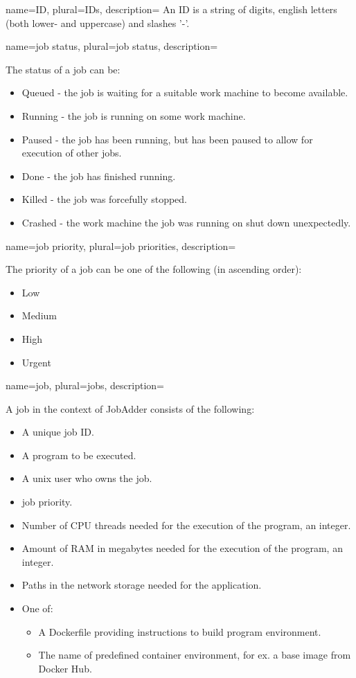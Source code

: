 {
  name=ID,
  plural=IDs,
  description={
    An ID is a string of digits, english letters (both lower- and uppercase) and slashes '-'.
  }
}
{
  name=job status,
  plural=job status,
  description={
    The status of a job can be:
    \begin{itemize}
      \item Queued - the job is waiting for a suitable work machine to become available.
      \item Running - the job is running on some work machine.
      \item Paused - the job has been running, but has been paused to allow for execution of other jobs.
      \item Done - the job has finished running.
      \item Killed - the job was forcefully stopped.
      \item Crashed - the work machine the job was running on shut down unexpectedly.
    \end{itemize}
  }
}
{
  name=job priority,
  plural=job priorities,
  description={
    The priority of a job can be one of the following (in ascending order):
    \begin{itemize}
      \item Low
      \item Medium
      \item High
      \item Urgent
    \end{itemize}
  }
}
{
  name=job,
  plural=jobs,
  description={
      A job in the context of JobAdder consists of the following:
      \begin{itemize}
        \item A unique job \gls{ID}.
        \item A program to be executed.
        \item A unix user who owns the job.
        \item \Gls{job priority}.
        \item Number of CPU threads needed for the execution of the program, an integer.
        \item Amount of RAM in megabytes needed for the execution of the program, an integer.
        \item Paths in the network storage needed for the application.
        \item One of:
        \begin{itemize}
          \item A Dockerfile providing instructions to build program environment.
          \item The name of predefined container environment, for ex. a base image from Docker Hub.
        \end{itemize}
     \end{itemize}
  }
}
